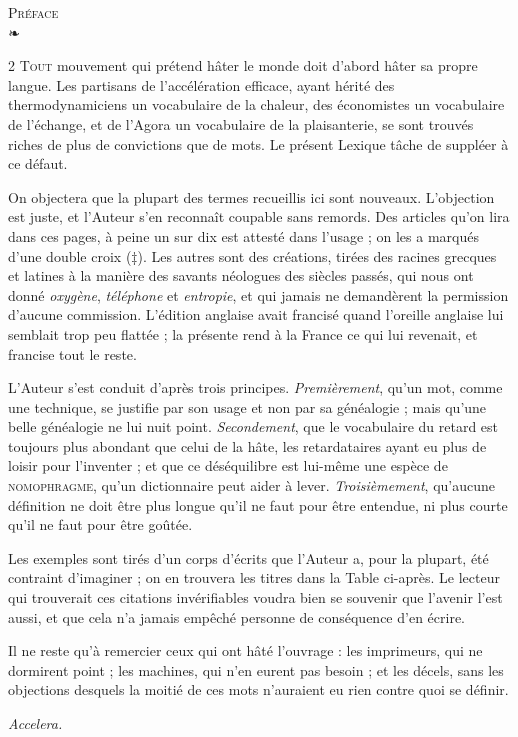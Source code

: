 \documentclass[10pt,twoside]{article}
\newcommand\xr[1]{\textsc{#1}}
\begin{document}
\pagestyle{front}
\setcounter{page}{3}
\begin{center}
{\dispfont\Large\scshape Préface}\\[2pt]
{\color{rubric}❧}
\end{center}
\vspace{2mm}

\begin{multicols}{2}
\small
\lettrine{T}{out} mouvement qui prétend hâter le monde doit d'abord hâter sa propre langue. Les partisans de l'accélération efficace, ayant hérité des thermodynamiciens un vocabulaire de la chaleur, des économistes un vocabulaire de l'échange, et de l'Agora un vocabulaire de la plaisanterie, se sont trouvés riches de plus de convictions que de mots. Le présent Lexique tâche de suppléer à ce défaut.

On objectera que la plupart des termes recueillis ici sont nouveaux. L'objection est juste, et l'Auteur s'en reconnaît coupable sans remords. Des articles qu'on lira dans ces pages, à peine un sur dix est attesté dans l'usage ; on les a marqués d'une double croix (\textcolor{rubric}{‡}). Les autres sont des créations, tirées des racines grecques et latines à la manière des savants néologues des siècles passés, qui nous ont donné \textit{oxygène}, \textit{téléphone} et \textit{entropie}, et qui jamais ne demandèrent la permission d'aucune commission. L'édition anglaise avait francisé quand l'oreille anglaise lui semblait trop peu flattée ; la présente rend à la France ce qui lui revenait, et francise tout le reste.

L'Auteur s'est conduit d'après trois principes. \textit{Premièrement}, qu'un mot, comme une technique, se justifie par son usage et non par sa généalogie ; mais qu'une belle généalogie ne lui nuit point. \textit{Secondement}, que le vocabulaire du retard est toujours plus abondant que celui de la hâte, les retardataires ayant eu plus de loisir pour l'inventer ; et que ce déséquilibre est lui-même une espèce de \xr{nomophragme}, qu'un dictionnaire peut aider à lever. \textit{Troisièmement}, qu'aucune définition ne doit être plus longue qu'il ne faut pour être entendue, ni plus courte qu'il ne faut pour être goûtée.

Les exemples sont tirés d'un corps d'écrits que l'Auteur a, pour la plupart, été contraint d'imaginer ; on en trouvera les titres dans la Table ci-après. Le lecteur qui trouverait ces citations invérifiables voudra bien se souvenir que l'avenir l'est aussi, et que cela n'a jamais empêché personne de conséquence d'en écrire.

Il ne reste qu'à remercier ceux qui ont hâté l'ouvrage : les imprimeurs, qui ne dormirent point ; les machines, qui n'en eurent pas besoin ; et les décels, sans les objections desquels la moitié de ces mots n'auraient eu rien contre quoi se définir.

\hfill\textit{Accelera.}
\end{multicols}
\end{document}
